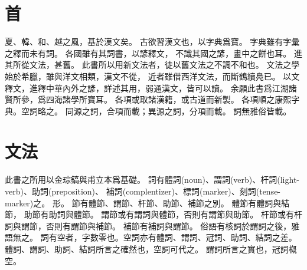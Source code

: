 \chapter*{首}
夏、韓、和、越之風，基於漢文矣。
古欲習漢文也，以字典爲寶。
字典雖有字彙之釋而未有詞。
各國雖有其詞書，以諺釋文，
不識其國之諺，畫中之餅也耳。
進其所從文法，甚舊。
此書所以用新文法者，徒以舊文法之不調不和也。
文法之學始於希臘，雖與洋文相類，漢文不從，
近者雖借西洋文法，而斷鶴續鳧已\parencite{Ahn:2012}。
以文釋文，進釋中華內外之諺，詳述其用，弱通漢文，皆可以讀。
余願此書爲江湖諸賢所參，爲四海諸學所寶耳。
各項或取諸漢籍，或古道而新製。
各項順之康熙字典。空詞略之。
同源之詞，合項而載；異源之詞，分項而載。
詞無雅俗皆載。
\chapter*{文法}
此書之所用以金琮鎬與甫立本爲基礎。
詞有體詞(noun)、謂詞(verb)、杆詞(light-verb)、助詞(preposition)、
補詞(complentizer)、標詞(marker)、刻詞(tense-marker)之\parencite[43-44]{PulleyblankYang:2005}\parencite[2-35]{Kim:2019}。
形。
節有體節、謂節、杆節、助節、補節之別\parencite[15]{Kim:2019}。
體節有體詞與結節，
助節有助詞與體節。
謂節或有謂詞與體節，否則有謂節與助節。
杆節或有杆詞與謂節，否則有謂節與補節。
補節有補詞與謂節。
俗語有核詞於謂詞之後，雅語無之。
詞有空者，字數零也\parencite[2]{Kim:2019}。空詞亦有體詞、謂詞、冠詞、助詞、結詞之差。
體詞、謂詞、助詞、結詞所言之確然也，空詞可代之。
謂詞所言之實也，冠詞槪空。
